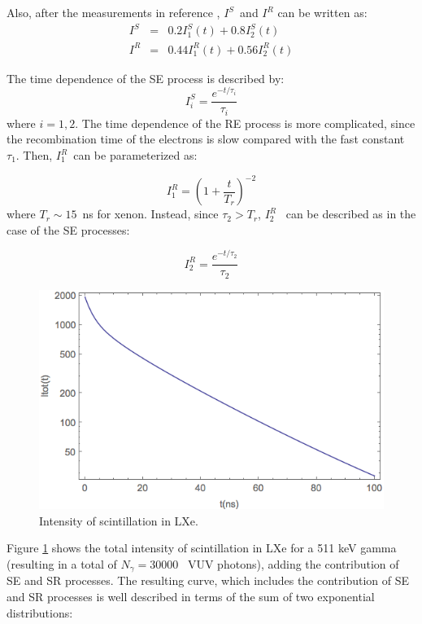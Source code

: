 \documentclass[review]{elsarticle}
\begin{document}
Also, after the measurements in reference \cite{Kubota79}, $I^S$~and $I^R$ can be written as:
\begin{eqnarray}
I^S & = & 0.2 I_1^S(t) +  0.8 I_2^S(t) \\
 I^R & = & 0.44 I_1^R(t) +  0.56 I_2^R(t)
\end{eqnarray}

The time dependence of the SE process is described by:
\begin{equation}
I^S_i = \frac{e^{-t/\tau_i}}{\tau_i}
\end{equation}
%
where $i=1,2$. The time dependence of the RE process is more complicated, since the recombination time
of the electrons is slow compared with the fast constant $\tau_1$. Then, $I^R_1$~can be parameterized \cite{Kubota79} as: 

\begin{equation}
I^R_1 =(1 + \frac{t}{T_r})^{-2}
\end{equation}
%
where $T_r \sim 15$~ns for xenon. Instead, since $\tau_2 > T_r$, $I^R_2$~ can be described as in the case of the SE processes: 

\begin{equation}
I^R_2 =\frac{e^{-t/\tau_2}}{\tau_2}
\end{equation}

\begin{figure}[!bhtp]
	\centering
	\includegraphics[scale=0.6]{../img/LXeScintillation2.png}
	\caption{\label{fig.scint} Intensity of scintillation in LXe. }
\end{figure}

Figure \ref{fig.scint} shows the total intensity of scintillation in LXe for a 511 keV gamma (resulting in a total of $N_\gamma =30000$~ VUV photons), adding the contribution of SE and SR processes. The resulting curve, which includes the contribution of SE and SR processes is well described in terms of the sum of two exponential distributions: 
\end{document}
